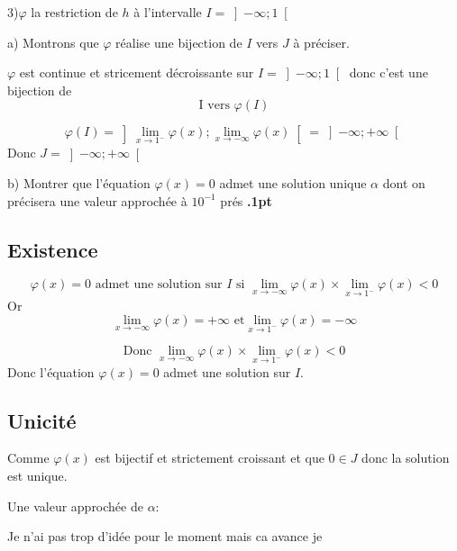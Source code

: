 \documentclass[12pt]{article}
\begin{document}
3)$\varphi$ la restriction de $h$ à l’intervalle $I=\left]-\infty; 1 \right[ $
   
    a) Montrons que $\varphi$  réalise une bijection de $I$ vers $J$  à préciser.
    
$\varphi$ est continue et stricement décroissante sur $I=\left]-\infty; 1 \right[  $ donc c'est une bijection de \[\text{I vers } \varphi(I)\]

\[\varphi(I)=\left] \lim_{x \to 1^{-}}\varphi(x); \lim_{x \to -\infty}\varphi(x) \right[=\left]-\infty; +\infty\right[\]
    Donc $J=\left]-\infty; +\infty\right[$
    
b) Montrer que l’équation $\varphi(x)=0$ admet une solution unique $\alpha$ dont on précisera une valeur approchée à $10^{-1}$ prés \textbf{.1pt}
\subsection*{Existence}
\[\varphi(x)=0 \text{ admet une solution sur $I$ si } \lim_{x \to -\infty}\varphi(x)\times\lim_{x \to 1^{-}}\varphi(x)<0\]
Or
\[\lim_{x \to -\infty}\varphi(x)=+\infty \text{ et} \lim_{x \to 1^{-}}\varphi(x)=-\infty\]

\[\text{Donc } \lim_{x \to -\infty}\varphi(x)\times\lim_{x \to 1^{-}}\varphi(x)<0\]
Donc l'équation $\varphi(x)=0$ admet une solution sur $I$.
\subsection*{Unicité}
Comme $\varphi(x)$ est bijectif et strictement croissant et que $0\in J$ donc la solution est unique. 

Une valeur approchée de $\alpha$:

Je n'ai pas trop d'idée pour le moment mais ca avance je 
\end{document}
